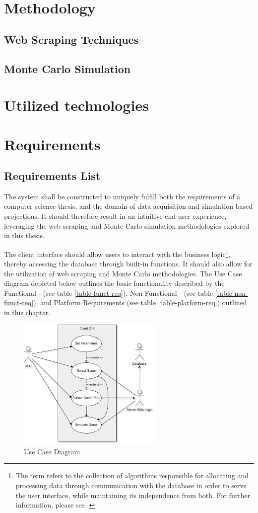 \documentclass{thesis-ekf}
\theoremstyle{definition}
\theoremstyle{remark}
\begin{document}
\chapter{Methodology}
\section{Web Scraping Techniques}
\section{Monte Carlo Simulation}


\chapter{Utilized technologies}


\chapter{Requirements}

\section{Requirements List}
The system shall be constructed to uniquely fulfill both the requirements of a computer science thesis, and the domain of data acquisition and simulation based projections. It should therefore result in an intuitive end-user experience, leveraging the web scraping and Monte Carlo simulation methodologies explored in this thesis.

The client interface should allow users to interact with the business logic\footnote{The term refers to the collection of algorithms responsible for allocating and processing data through communication with the database in order to serve the user interface, while maintaining its independence from both. For further information, please see \cite{Booch}.}, thereby accessing the database through built-in functions. It should also allow for the utilization of web scraping and Monte Carlo methodologies. The Use Case diagram depicted below outlines the basic functionality described by the Functional - (see table {\ref{table-funct-req}}), Non-Functional - (see table {\ref{table-non-funct-req}}), and Platform Requirements (see table {\ref{table-platform-req}}) outlined in this chapter.

\begin{figure}[th!]
	\centering
	\includegraphics[width=7cm]{img/usecase}
	\caption{Use Case Diagram}
	\label{img-usecase}
\end{figure}
\end{document}
